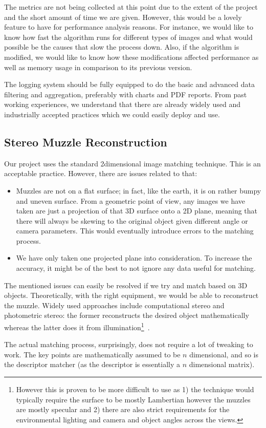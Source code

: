 The metrics are not being collected at this point due to the extent of the project and the short amount of time we are given. However, this would be a lovely feature to have for performance analysis reasons. For instance, we would like to know how fast the algorithm runs for different types of images and what would possible be the causes that slow the process down. Also, if the algorithm is modified, we would like to know how these modifications affected performance as well as memory usage in comparison to its previous version.

The logging system should be fully equipped to do the basic and advanced data filtering and aggregation, preferably with charts and PDF reports. From past working experiences, we understand that there are already widely used and industrially accepted practices which we could easily deploy and use.

\subsection{Stereo Muzzle Reconstruction}

Our project uses the standard 2\-dimensional image matching technique. This is an acceptable practice. However, there are issues related to that:

\begin{itemize}
	\item Muzzles are not on a flat surface; in fact, like the earth, it is on rather bumpy and uneven surface. From a geometric point of view, any images we have taken are just a projection of that 3D surface onto a 2D plane, meaning that there will always be skewing to the original object given different angle or camera parameters. This would eventually introduce errors to the matching process.
	\item We have only taken one projected plane into consideration. To increase the accuracy, it might be of the best to not ignore any data useful for matching.
\end{itemize}

The mentioned issues can easily be resolved if we try and match based on 3D objects. Theoretically, with the right equipment, we would be able to reconstruct the muzzle. Widely used approaches include computational stereo and photometric stereo: the former reconstructs the desired object mathematically~\cite{computational_stereo} whereas the latter does it from illumination\footnote{However this is proven to be more difficult to use as 1) the technique would typically require the surface to be mostly Lambertian however the muzzles are mostly specular and 2) there are also strict requirements for the environmental lighting and camera and object angles across the views.}~\cite{photometric_stereo}.

The actual matching process, surprisingly, does not require a lot of tweaking to work. The key points are mathematically assumed to be $n$ dimensional, and so is the descriptor matcher (as the descriptor is essentially a $n$ dimensional matrix).
